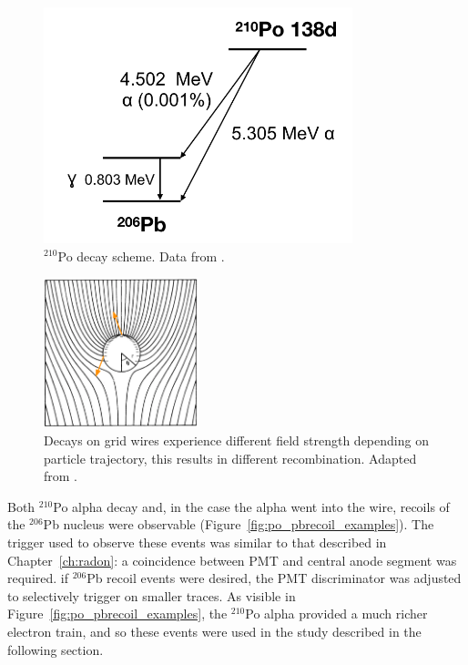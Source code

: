 \begin{figure}[htbp]
\begin{center}
\includegraphics[width=0.8\textwidth]{figures/etrains/po_decay.png}
\caption{$^{210}$Po decay scheme. Data from \cite{LNHB}.}
\label{fig:po_decay}
\end{center}
\end{figure}

\begin{figure}[htbp]
\begin{center}
\includegraphics[width=0.4\textwidth]{figures/etrains/field_variation.png}
\caption{Decays on grid wires experience different field strength depending on particle trajectory, this results in different recombination. Adapted from \cite{Blum2008}. }
\label{fig:field_variation}
\end{center}
\end{figure}

Both $^{210}$Po alpha decay and, in the case the alpha went into the wire, recoils of the $^{206}$Pb nucleus were observable (Figure~\ref{fig:po_pbrecoil_examples}). The trigger used to observe these events was similar to that described in Chapter~\ref{ch:radon}: a coincidence between \ac{PMT} and central anode segment was required. if $^{206}$Pb recoil events were desired, the \ac{PMT} discriminator was adjusted to selectively trigger on smaller traces. As visible in Figure~\ref{fig:po_pbrecoil_examples}, the $^{210}$Po alpha provided a much richer electron train, and so these events were used in the study described in the following section.

